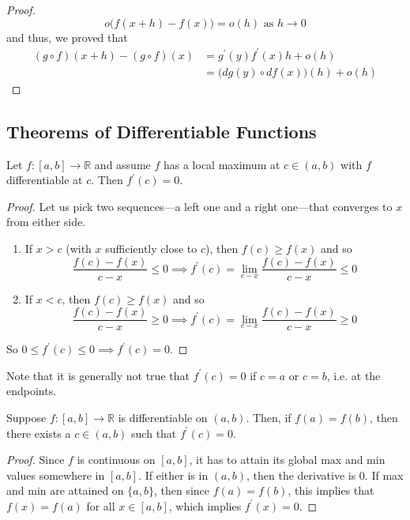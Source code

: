 \begin{proof}
    \[o\big(f(x + h) - f(x) \big) = o(h) \text{ as } h \rightarrow 0\]
    and thus, we proved that
    \begin{align*}
        (g \circ f)(x + h) - (g \circ f)(x) & = g^\prime (y) f^\prime (x) h + o(h) \\
        & = \big(dg(y) \circ df(x)\big) (h) + o(h)
    \end{align*}
  \end{proof}

\subsection{Theorems of Differentiable Functions}

  \begin{theorem}
    Let $f: [a, b] \to \mathbb{R}$ and assume $f$ has a local maximum at $c \in (a, b)$ with $f$ differentiable at $c$. Then $f^\prime (c) = 0$. 
  \end{theorem}
  \begin{proof}
    Let us pick two sequences---a left one and a right one---that converges to $x$ from either side. 
    \begin{enumerate}
      \item If $x > c$ (with $x$ sufficiently close to $c$), then $f(c) \geq f(x)$ and so 
      \begin{equation}
        \frac{f(c) - f(x)}{c - x} \leq 0 \implies f^\prime (c) = \lim_{c - x} \frac{f(c) - f(x)}{c - x} \leq 0
      \end{equation}

      \item If $x < c$, then $f(c) \geq f(x)$ and so 
      \begin{equation}
        \frac{f(c) - f(x)}{c - x} \geq 0 \implies f^\prime (c) = \lim_{c - x} \frac{f(c) - f(x)}{c - x} \geq 0
      \end{equation}
    \end{enumerate}
    So $0 \leq f^\prime (c) \leq 0 \implies f^\prime(c) = 0$. 
  \end{proof}

  Note that it is generally not true that $f^\prime (c) = 0$ if $c = a$ or $c = b$, i.e. at the endpoints. 

  \begin{theorem}
    Suppose $f: [a, b] \to \mathbb{R}$ is differentiable on $(a, b)$. Then, if $f(a) = f(b)$, then there exists a $c \in (a, b)$ such that $f^\prime (c) = 0$. 
  \end{theorem}
  \begin{proof}
    Since $f$ is continuous on $[a, b]$, it has to attain its global max and min values somewhere in $[a, b]$. If either is in $(a, b)$, then the derivative is $0$. If max and min are attained on $\{a, b\}$, then since $f(a) = f(b)$, this implies that $f(x) = f(a)$ for all $x \in [a, b]$, which implies $f^\prime (x) = 0$. 
  \end{proof}

